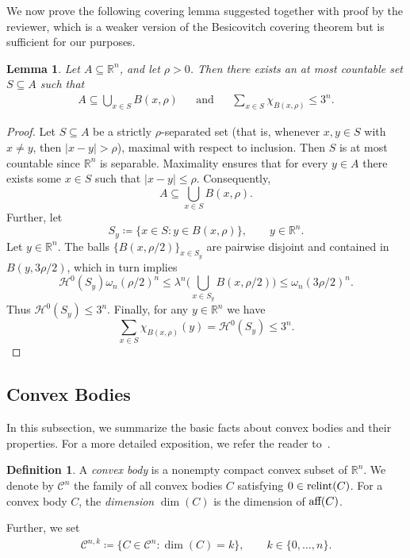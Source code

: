 \documentclass[pdflatex,sn-mathphys-num]{sn-jnl}
\theoremstyle{plain}
\newtheorem{lemma}[theorem]{Lemma}
\theoremstyle{definition}
\newtheorem{definition}[theorem]{Definition}
\DeclareMathOperator{\relint}{\textup{relint}}
\DeclareMathOperator{\aff}{\textup{aff}}
\begin{document}
We now prove the following covering lemma suggested together with proof by the reviewer, which is a weaker version of the
Besicovitch covering theorem but is sufficient for our purposes.
\begin{lemma}\label{bes}
       Let $A\subseteq\mathbb{R}^n$, and let $\rho>0$. Then there exists an at most countable set $S\subseteq A$ such that \begin{align*}
          A\subseteq\bigcup_{x\in S}B(x, \rho) &&\text{and}&& \sum_{x\in S}\chi_{B(x, \rho)}\leq 3^n.
       \end{align*}
\end{lemma}
\begin{proof}
    Let $S\subseteq A$ be a strictly $\rho$-separated set (that is, whenever $x, y\in S$ with $x\neq y$, then $|x-y|>\rho$), maximal with respect to inclusion. Then $S$ is at most countable since $\mathbb{R}^n$ is separable. Maximality ensures that for every $y\in A$ there exists some $x\in S$ such that $|x-y|\leq \rho.$ Consequently, $$A\subseteq\bigcup_{x\in S}B(x, \rho).$$ Further, let $$S_{y}\coloneqq \{x\in S : y\in B(x, \rho)\}, \qquad y\in\mathbb{R}^n.$$ Let $y\in \mathbb{R}^n$. The balls $\{B(x, \rho/2)\}_{x\in S_{y}}$ are pairwise disjoint and contained in $B(y, 3\rho/2)$, which in turn implies $$\mathcal{H}^0(S_y)\omega_n(\rho/2)^n\leq \lambda^n\Big(\bigcup_{x\in S_y} B(x, \rho/2)\Big)\leq \omega_n(3\rho/2)^n.$$ Thus $\mathcal{H}^0(S_y)\leq 3^n.$ Finally, for any $y\in\mathbb{R}^n$ we have $$\sum_{x\in S}\chi_{B(x,\rho)}(y)=\mathcal{H}^0(S_y)\leq 3^n.$$
\end{proof}
\subsection{Convex Bodies}
In this subsection, we summarize the basic facts about convex bodies and their properties. For a more detailed exposition, we refer the reader to~\cite{rolf}.
\begin{definition}\label{convexity}
    A \emph{convex body} is a nonempty compact convex
subset of $\mathbb R^n$. We denote by $\mathcal C^n$ the family of all convex
bodies $C$ satisfying $0\in\relint(C)$. For a convex body $C$, the \emph{dimension}
$\dim(C)$ is the dimension of $\aff(C)$. 
    
    Further, we set \begin{align*}
        \mathcal{C}^{n, k}\coloneq\{C\in\mathcal{C}^n : \dim(C)=k\}, \qquad k\in\{0, \dots, n\}.
    \end{align*}
    \end{definition}
\end{document}
